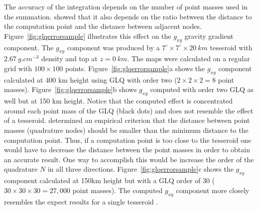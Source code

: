 \documentclass[paper,twocolumn]{geophysics}
\begin{document}
The accuracy of the integration
depends on the number of point masses used in the summation.
\citet{Ku1977} showed that it also depends on the ratio between
the distance to the computation point and the distance between adjacent nodes.
Figure~\ref{fig:glqerrorsample}
illustrates this effect on the $g_{xy}$ gravity gradient component.
The $g_{xy}$ component was produced by a
$7^\circ \times 7^\circ \times 20\ km$ tesseroid
with $2.67\ g.cm^{-3}$ density
and top at $z=0\ km$.
The maps were calculated on a regular grid
with $100\times100$ points.
Figure~\ref{fig:glqerrorsample}a shows the $g_{xy}$ component
calculated at 400 km height using
GLQ with order two ($2 \times 2 \times 2 = 8$ point masses).
Figure~\ref{fig:glqerrorsample}b shows $g_{xy}$ computed with order two
GLQ as well but at 150 km height.
Notice that the computed effect is concentrated around each point mass
of the GLQ (black dots) and does not resemble the effect of a tesseroid.
\citet{Ku1977} determined an empirical criterion that the distance between
point masses (quadrature nodes) should be smaller than the minimum distance to
the computation point.
Thus, if a computation point is too close to the tesseroid one would have to
decrease the distance between the point masses in order to obtain an accurate
result.
One way to accomplish this would be increase the order of the quadrature
$N$ in all three directions.
Figure~\ref{fig:glqerrorsample}c shows the $g_{xy}$ component calculated at
150km height but with a GLQ order of 30
($30 \times 30 \times 30 = 27,000$ point masses).
The computed $g_{xy}$ component more closely resembles
the expect results for a single tesseroid \citep{Asgharzadeh2007}.
\end{document}
